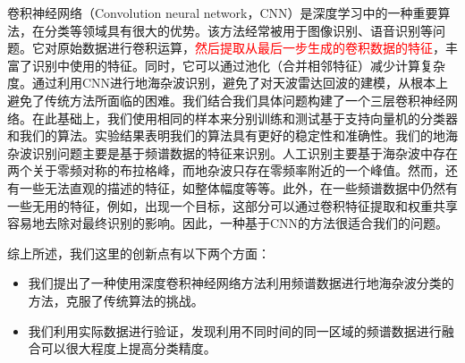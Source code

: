 卷积神经网络（Convolution neural network，CNN）是深度学习中的一种重要算法，在分类等领域具有很大的优势。该方法经常被用于图像识别、语音识别等问题。它对原始数据进行卷积运算，\textcolor{red}{然后提取从最后一步生成的卷积数据的特征}，丰富了识别中使用的特征。同时，它可以通过池化（合并相邻特征）减少计算复杂度。通过利用CNN进行地海杂波识别，避免了对天波雷达回波的建模，从根本上避免了传统方法所面临的困难。我们结合我们具体问题构建了一个三层卷积神经网络。在此基础上，我们使用相同的样本来分别训练和测试基于支持向量机的分类器和我们的算法。实验结果表明我们的算法具有更好的稳定性和准确性。我们的地海杂波识别问题主要是基于频谱数据的特征来识别。人工识别主要基于海杂波中存在两个关于零频对称的布拉格峰，而地杂波只存在零频率附近的一个峰值。然而，还有一些无法直观的描述的特征，如整体幅度等等。此外，在一些频谱数据中仍然有一些无用的特征，例如，出现一个目标，这部分可以通过卷积特征提取和权重共享容易地去除对最终识别的影响。因此，一种基于CNN的方法很适合我们的问题。

综上所述，我们这里的创新点有以下两个方面：
\begin{itemize}
	\item 我们提出了一种使用深度卷积神经网络方法利用频谱数据进行地海杂波分类的方法，克服了传统算法的挑战。
	\item 我们利用实际数据进行验证，发现利用不同时间的同一区域的频谱数据进行融合可以很大程度上提高分类精度。
\end{itemize}

